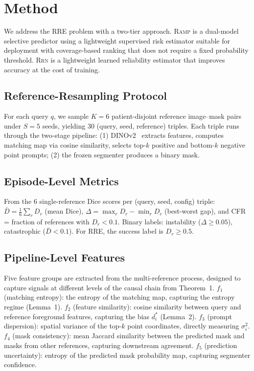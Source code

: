 \documentclass[10pt,twocolumn,letterpaper]{article}
\newcommand{\RAMP}{\textsc{Ramp}}
\newcommand{\RRN}{\textsc{Rrn}}
\begin{document}
\section{Method}

We address the RRE problem with a two-tier approach. \RAMP{} is a
dual-model selective predictor using a lightweight supervised risk estimator
suitable for deployment with coverage-based ranking that does not require a
fixed probability threshold. \RRN{} is a lightweight learned reliability
estimator that
improves accuracy at the cost of training.

\subsection{Reference-Resampling Protocol}

For each query $q$, we sample $K=6$ patient-disjoint reference image--mask
pairs under $S=5$ seeds, yielding 30 (query, seed, reference) triples. Each
triple runs through the two-stage pipeline: (1) DINOv2~\cite{oquab2023dinov2}
extracts features, computes matching map via cosine similarity, selects
top-$k$ positive and bottom-$k$ negative point prompts; (2) the frozen
segmenter produces a binary mask.

\subsection{Episode-Level Metrics}

From the 6 single-reference Dice scores per (query, seed, config) triple:
$\bar{D} = \frac{1}{6}\sum_r D_r$ (mean Dice), $\Delta = \max_r D_r -
\min_r D_r$ (best-worst gap), and CFR = fraction of references with $D_r <
0.1$. Binary labels: instability ($\Delta \geq 0.05$), catastrophic
($\bar{D} < 0.1$). For RRE, the success label is $D_r \geq 0.5$.

\subsection{Pipeline-Level Features}

Five feature groups are extracted from the multi-reference process, designed
to capture signals at different levels of the causal chain from Theorem~1.
$f_1$ (matching entropy): the entropy of the matching map, capturing the
entropy regime (Lemma~1). $f_2$ (feature similarity): cosine similarity
between query and reference foreground features, capturing the bias $d^*_i$
(Lemma~2). $f_3$ (prompt dispersion): spatial variance of the top-$k$ point
coordinates, directly measuring $\sigma^2_i$. $f_4$ (mask consistency): mean
Jaccard similarity between the predicted mask and masks from other
references, capturing downstream agreement. $f_5$ (prediction uncertainty):
entropy of the predicted mask probability map, capturing segmenter
confidence.
\end{document}
